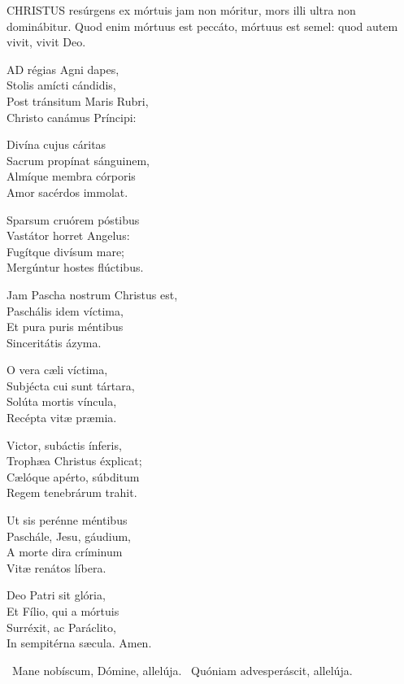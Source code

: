 

\lettrine[lines=2]{C}{HRISTUS} resúrgens ex mórtuis jam non móritur, mors illi ultra non dominábitur. Quod enim mórtuus est peccáto, mórtuus est semel: quod autem vivit, vivit Deo.


\lettrine[lines=2]{A}{D} régias Agni dapes,\\
Stolis amícti cándidis,\\
Post tránsitum Maris Rubri,\\
Christo canámus Príncipi:

Divína cujus cáritas\\
Sacrum propínat sánguinem,\\
Almíque membra córporis\\
Amor sacérdos immolat.

Sparsum cruórem póstibus\\
Vastátor horret Angelus:\\
Fugítque divísum mare;\\
Mergúntur hostes flúctibus.

Jam Pascha nostrum Christus est,\\
Paschális idem víctima,\\
Et pura puris méntibus\\
Sinceritátis ázyma.

O vera cæli víctima,\\
Subjécta cui sunt tártara,\\
Solúta mortis víncula,\\
Recépta vitæ præmia.

Victor, subáctis ínferis,\\
Trophæa Christus éxplicat;\\
Cælóque apérto, súbditum\\
Regem tenebrárum trahit.

Ut sis perénne méntibus\\
Paschále, Jesu, gáudium,\\
A morte dira críminum\\
Vitæ renátos líbera.

Deo Patri sit glória,\\
Et Fílio, qui a mórtuis\\
Surréxit, ac Paráclito,\\
In sempitérna sæcula. Amen.

\V\ Mane nobíscum, Dómine, allelúja. \R\ Quóniam advesperáscit, allelúja.

